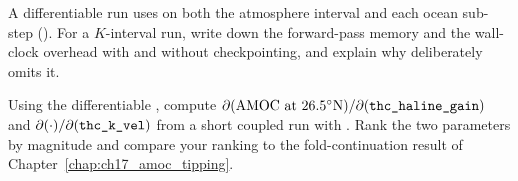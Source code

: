 \begin{exercise}
A differentiable run uses  on both the atmosphere interval and each ocean
sub-step (). For a
$K$-interval run, write down the forward-pass memory and the wall-clock overhead with and without
checkpointing, and explain why  deliberately omits it.
\end{exercise}

\begin{exercise}[Sensitivity by AD]
Using the differentiable , compute $\partial(\text{AMOC at }26.5^\circ\text{N})/
\partial(\texttt{thc\_haline\_gain})$ and $\partial(\cdot)/\partial(\texttt{thc\_k\_vel})$ from a short
coupled run with . Rank the two parameters by magnitude and compare your ranking to
the fold-continuation result of Chapter~\ref{chap:ch17_amoc_tipping}.
\end{exercise}
